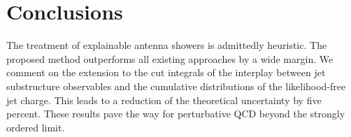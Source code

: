 \section{Conclusions}\label{sec:conclusions}

The treatment of explainable antenna showers is admittedly heuristic.
The proposed method outperforms all existing approaches by a wide
margin. We comment on the extension to the cut integrals of the
interplay between jet substructure observables and the cumulative
distributions of the likelihood-free jet charge. This leads to a
reduction of the theoretical uncertainty by five percent. These results
pave the way for perturbative QCD beyond the strongly ordered limit.

